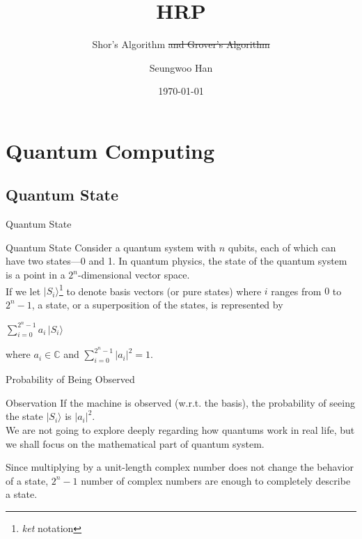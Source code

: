 \documentclass{beamer}
\title{HRP}
\subtitle{Shor's Algorithm \st{and Grover's Algorithm}}
\author{Seungwoo Han}
\date{\today}
\newcommand{\mbb}[1]{\mathbb{#1}}
\renewcommand{\:}{\text{ }}
\begin{document}
    
    \begin{frame}
        \titlepage
    \end{frame}

    \section{Quantum Computing}
    \subsection{Quantum State}
    \begin{frame}{Quantum State}
        \begin{block}{Quantum State}
            Consider a quantum system with $n$ qubits, each of which can have two states---0 and 1.
            In quantum physics, the state of the quantum system is a point in a $2^n$-dimensional vector space.\\[1em]
            If we let $\vert S_i \rangle$\footnote{\textit{ket} notation} to denote basis vectors (or \alert{pure states}) where $i$ ranges from $0$ to $2^n-1$,
            a state, or a \alert{superposition} of the states, is represented by \\[.7em]
            \centerline{$\displaystyle \sum_{i=0}^{2^n-1} a_i \,\vert S_i \rangle$}\vspace*{.7em}
            where $a_i \in \mbb{C}$ and $\sum_{i=0}^{2^n-1} |a_i|^2 = 1$.
        \end{block}
    \end{frame}

    \begin{frame}{Probability of Being Observed}
        \begin{block}{Observation}
            If the machine is observed (w.r.t. the basis), the \alert{probability of seeing the state} $\vert S_i \rangle$ is $|a_i|^2$.\\[1em]
            We are not going to explore deeply regarding how quantums work in real life, but we shall focus on the mathematical part of quantum system.
        \end{block}
        \begin{alertblock}{}
            Since multiplying by a unit-length complex number does not change the behavior of a state,
            $2^n-1$ number of complex numbers are enough to completely describe a state.
        \end{alertblock}
    \end{frame}
\end{document}
